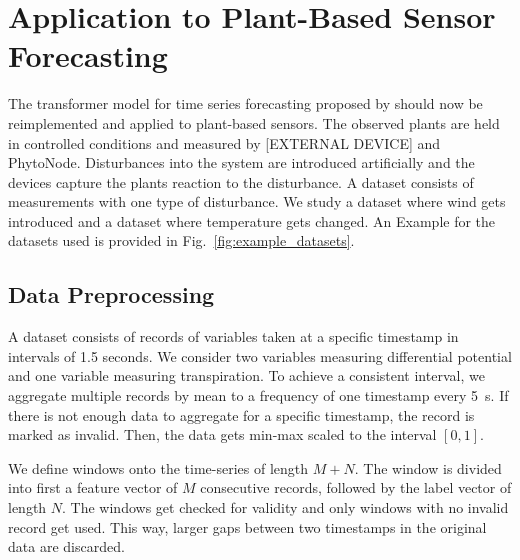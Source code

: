 \documentclass[11pt,a4paper]{article}
\begin{document}
\section{Application to Plant-Based Sensor Forecasting}
The transformer model for time series forecasting proposed by \citet{wu_2020} should now be reimplemented and applied to plant-based sensors.
The observed plants are held in controlled conditions and measured by [EXTERNAL DEVICE] and PhytoNode. %
Disturbances into the system are introduced artificially and the devices capture the plants reaction to the disturbance.
A dataset consists of measurements with one type of disturbance. 
We study a dataset where wind gets introduced and a dataset where temperature gets changed. %
An Example for the datasets used is provided in Fig.~\ref{fig:example_datasets}.

\subsection{Data Preprocessing}
A dataset consists of records of variables taken at a specific timestamp in intervals of 1.5 seconds. 
We consider two variables measuring differential potential and one variable measuring transpiration.
To achieve a consistent interval, we aggregate multiple records by mean to a frequency of one timestamp every 5~s.
If there is not enough data to aggregate for a specific timestamp, the record is marked as invalid.
Then, the data gets min-max scaled to the interval $[0,1]$.

We define windows onto the time-series of length $M+N$.
The window is divided into first a feature vector of $M$ consecutive records, followed by the label vector of length $N$.
The windows get checked for validity and only windows with no invalid record get used.
This way, larger gaps between two timestamps in the original data are discarded.
\end{document}
